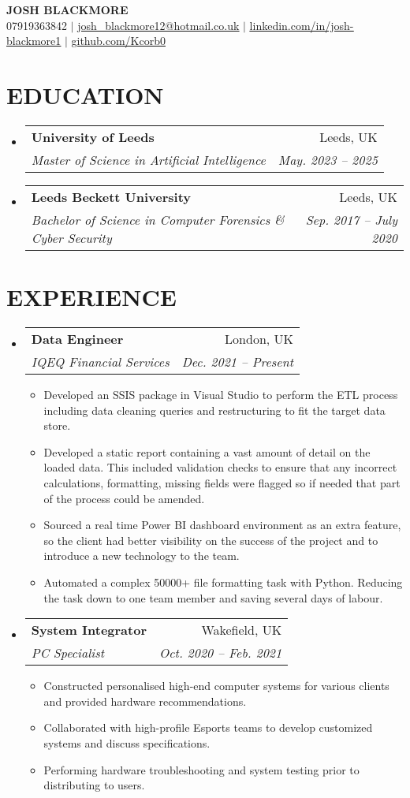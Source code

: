 \documentclass[letterpaper, 11pt]{article}
\makeatletter
\newcommand{\resumeItem}[1]{
  \item\small{
    {#1 \vspace{-2pt}}
  }
}
\newcommand{\resumeSubheading}[4]{
  \vspace{-2pt}\item
    \begin{tabular*}{0.97\textwidth}[t]{l@{\extracolsep{\fill}}r}
      \textbf{#1} & #2 \\
      \textit{\small#3} & \textit{\small #4} \\
    \end{tabular*}\vspace{-7pt}
}
\newcommand{\resumeSubHeadingListStart}{\begin{itemize}[leftmargin=0.15in, label={}]}
\newcommand{\resumeSubHeadingListEnd}{\end{itemize}}
\newcommand{\resumeItemListStart}{\begin{itemize}}
\newcommand{\resumeItemListEnd}{\end{itemize}\vspace{-5pt}}
\makeatother
\begin{document}

\begin{center}
    \textbf{\Huge \scshape JOSH BLACKMORE} \\ \vspace{1pt}
    \small 07919363842 $|$ \href{mailto:josh_blackmore12@hotmail.co.uk}{\underline{josh\_blackmore12@hotmail.co.uk}} $|$
    \href{https://linkedin.com/in/josh-blackmore1}
    {\underline{linkedin.com/in/josh-blackmore1}} $|$
    \href{https://github.com/Kcorb0}{\underline{github.com/Kcorb0}}
\end{center}


\section{EDUCATION}
  \resumeSubHeadingListStart
    \resumeSubheading
      {University of Leeds}{Leeds, UK}
      {Master of Science in Artificial Intelligence}{May. 2023 -- 2025}
    \resumeSubheading
      {Leeds Beckett University}{Leeds, UK}
      {Bachelor of Science in Computer Forensics \& Cyber Security}{Sep. 2017 -- July 2020}
  \resumeSubHeadingListEnd


\section{EXPERIENCE}
  \resumeSubHeadingListStart

    \resumeSubheading
      {Data Engineer}{London, UK}
      {IQEQ Financial Services}{Dec. 2021 -- Present}
      \resumeItemListStart
        \resumeItem{Developed an SSIS package in Visual Studio to perform the ETL process including data cleaning queries and restructuring to fit the target data store.}
        \resumeItem{Developed a static report containing a vast amount of detail on the loaded data. This included validation checks to ensure that any incorrect calculations, formatting, missing fields were flagged so if needed that part of the process could be amended.}
        \resumeItem{Sourced a real time Power BI dashboard environment as an extra feature, so the client had better visibility on the success of the project and to introduce a new technology to the team.}
        \resumeItem{Automated a complex 50000+ file formatting task with Python. Reducing the task down to one team member and saving several days of labour.}
      \resumeItemListEnd
      
    \resumeSubheading
      {System Integrator}{Wakefield, UK}
      {PC Specialist}{Oct. 2020 -- Feb. 2021}
      \resumeItemListStart
        \resumeItem{Constructed personalised high-end computer systems for various clients and provided hardware recommendations.}
        \resumeItem{Collaborated with high-profile Esports teams to develop customized systems and discuss specifications.}
        \resumeItem{Performing hardware troubleshooting and system testing prior to distributing to users.}
    \resumeItemListEnd
  \resumeSubHeadingListEnd
\end{document}
